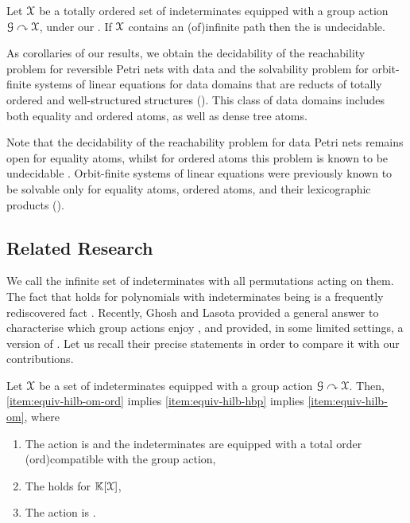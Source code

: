 \begin{theorem}[name={Undecidability of Equivariant Ideal Membership},restate=thm:undecidable-paths]
  \label{thm:undecidable-paths}
  Let $\mathcal{X}$ be a totally ordered set of indeterminates
  equipped with a group action $\mathcal{G} \curvearrowright \mathcal{X}$, under our .
  If $\mathcal{X}$ contains an \kl(of){infinite path}
  then the  is undecidable.
\end{theorem}
%
As corollaries of our results, we obtain the decidability of the reachability problem for reversible Petri nets with data and the solvability problem for orbit-finite systems of linear equations for data domains that are reducts of totally ordered and well-structured structures ().
This class of data domains includes both equality and ordered atoms,
as well as dense tree atoms.

Note that the decidability of the reachability problem for data Petri nets remains open for equality atoms, whilst for ordered atoms this problem is known to be undecidable \cite{RODA11}.
Orbit-finite systems of linear equations were previously known to be solvable only for equality atoms, ordered atoms, and their lexicographic products (\cite{GHOLAS24}).
%
\subsection{Related Research} We call  the infinite set
of indeterminates with all permutations acting on them. The fact that
 holds for polynomials with indeterminates being
 is a frequently rediscovered fact
\cite{AH07,AH08,HS12,HKL18}.
Recently, Ghosh and Lasota provided a general answer to characterise which group actions enjoy 
\cite[Theorem 11 and 12]{GHOLAS24}, and provided, in some limited settings, a
version of  \cite[Section 6]{GHOLAS24}.
Let us recall their precise statements in order to compare it with our contributions.

\begin{theorem}[name={\cite[Theorem 11 and 12]{GHOLAS24}}]
  \label{thm:equiv-hilbert-property}
  Let $\mathcal{X}$ be a set of indeterminates equipped with a
  group action $\mathcal{G} \curvearrowright \mathcal{X}$.
  Then,
  \cref{item:equiv-hilb-om-ord} implies 
  \cref{item:equiv-hilb-hbp} implies 
  \cref{item:equiv-hilb-om}, where
  \begin{enumerate}
    \item \label{item:equiv-hilb-om-ord}
      The action is  and the indeterminates are equipped with a total order
      \kl(ord){compatible} with the group action,
    \item \label{item:equiv-hilb-hbp}
      The  holds for  $\mathbb{K}[\mathcal{X}]$,
    \item \label{item:equiv-hilb-om}
      The action is .
  \end{enumerate}
\end{theorem}

